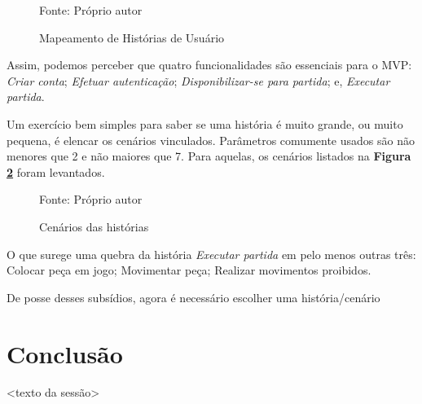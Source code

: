 \documentclass[12pt,a4paper,oneside,english,brazil]{article}
\begin{document}
      \begin{figure}[h]
        \centering
        \caption{Mapeamento de Histórias de Usuário}
        Fonte: Próprio autor\footnotemark
        \label{fig:fluxogeral}
      \end{figure}

      Assim, podemos perceber que quatro funcionalidades são essenciais para o
      MVP: \emph{Criar conta}; \emph{Efetuar autenticação};
      \emph{Disponibilizar-se para partida}; e, \emph{Executar partida}.

      Um exercício bem simples para saber se uma história é muito grande, ou
      muito pequena, é elencar os cenários vinculados. Parâmetros comumente
      usados são não menores que 2 e não maiores que 7. Para aquelas, os
      cenários listados na \textbf{Figura \ref{fig:cenarios-das-historias}}
      foram levantados.

      \begin{figure}[h]
        \centering
        \caption{Cenários das histórias}
        
        Fonte: Próprio autor
        \label{fig:cenarios-das-historias}
      \end{figure}

      O que surege uma quebra da história \emph{Executar partida} em pelo menos
      outras três: Colocar peça em jogo; Movimentar peça; Realizar movimentos
      proibidos.

      De posse desses subsídios, agora é necessário escolher uma
      história/cenário

  \section{Conclusão}

    <texto da sessão>

  \clearpage

  \renewcommand\refname{Referências Bibliográficas}

    
    
\end{document}
